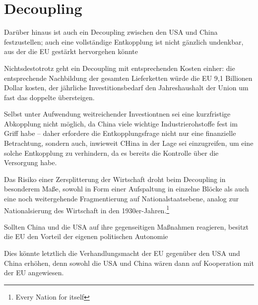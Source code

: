 \documentclass[12pt,a4paper,oneside]{book} %
\begin{document}
\section{Decoupling}


Darüber hinaus ist auch ein Decoupling zwischen den USA und China festzustellen; auch eine vollständige Entkopplung ist nicht gänzlich undenkbar, aus der die EU gestärkt hervorgehen könnte

Nichtsdestotrotz geht ein Decoupling mit entsprechenden Kosten einher: die entsprechende Nachbildung der gesamten Lieferketten würde die EU 9,1 Billionen Dollar kosten, der jährliche Investitionsbedarf den Jahreshaushalt der Union um fast das doppelte übersteigen.\autocite{https://www.ft.com/content/c6c1f5a5-3332-471b-87d5-253e03f8b90a?shareType=nongift&syn-25a6b1a6=1}

Selbst unter Aufwendung weitreichender Investiontnen sei eine kurzfristige Abkopplung nicht möglich, da China  viele wichtige Industrierohstoffe fest im Griff habe -- daher erfordere die Entkopplungsfrage nicht nur eine finanzielle Betrachtung, sondern auch, inwieweit CHina in der Lage sei einzugreifen,  um eine solche Entkopplung zu verhindern, da es bereits die Kontrolle über die Versorgung habe.\autocite{https://www.ft.com/content/c6c1f5a5-3332-471b-87d5-253e03f8b90a?shareType=nongift&syn-25a6b1a6=1}

Das Risiko einer Zersplitterung der Wirtschaft droht beim Decoupling in besonderem Maße, sowohl in Form einer Aufspaltung in einzelne Blöcke als auch eine noch weitergehende Fragmentierung auf Nationalstaatsebene, analog zur Nationalsierung des Wirtschaft in den 1930er-Jahren.\footnote{Every Nation for itself}

Sollten China und die USA auf ihre gegenseitigen Maßnahmen reagieren, besitzt die EU den Vorteil der eigenen politischen Autonomie

Dies könnte letztlich die Verhandlungsmacht der EU gegenüber den USA und China erhöhen, denn sowohl die USA und China wären dann auf Kooperation mit der EU angewiesen.
\end{document}
